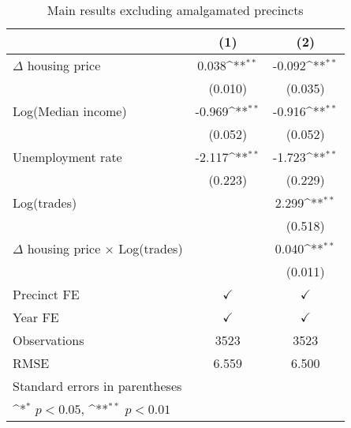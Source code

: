 \begin{table}[htbp]\centering
\def\sym#1{\ifmmode^{#1}\else\(^{#1}\)\fi}
\caption{Main results excluding amalgamated precincts} \footnotesize \label{calculated}
\begin{tabular}{l*{2}{c}}
\hline\hline
                    &\multicolumn{1}{c}{(1)}        &\multicolumn{1}{c}{(2)}        \\
\hline
$\Delta$ housing price&       0.038\sym{**}&      -0.092\sym{**}\\
                    &     (0.010)        &     (0.035)        \\
[1em]
Log(Median income)  &      -0.969\sym{**}&      -0.916\sym{**}\\
                    &     (0.052)        &     (0.052)        \\
[1em]
Unemployment rate   &      -2.117\sym{**}&      -1.723\sym{**}\\
                    &     (0.223)        &     (0.229)        \\
[1em]
Log(trades)         &                    &       2.299\sym{**}\\
                    &                    &     (0.518)        \\
[1em]
$\Delta$ housing price $\times$ Log(trades)&                    &       0.040\sym{**}\\
                    &                    &     (0.011)        \\
[1em]
\hline Precinct FE  &$\checkmark$        &$\checkmark$        \\
[1em]
Year FE             &$\checkmark$        &$\checkmark$        \\
\hline
Observations        &        3523        &        3523        \\
RMSE                &       6.559        &       6.500        \\
\hline\hline
\multicolumn{3}{l}{\footnotesize Standard errors in parentheses}\\
\multicolumn{3}{l}{\footnotesize \sym{*} \(p<0.05\), \sym{**} \(p<0.01\)}\\
\end{tabular}
\end{table}
